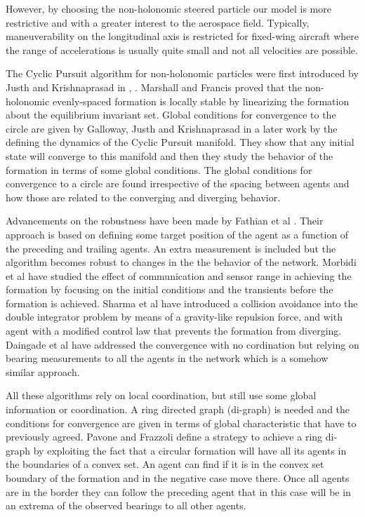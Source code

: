 However, by choosing the non-holonomic steered particle our model is more restrictive and with a greater interest to the aerospace field. Typically, maneuverability on the longitudinal axis is restricted for fixed-wing aircraft where the range of accelerations is usually quite small and not all velocities are possible. 

The Cyclic Pursuit algorithm for non-holonomic particles were first introduced by Justh and Krishnaprasad in \cite{justh2002simple}, \cite{justh2003steering}. Marshall and Francis \cite{marshall2004formations} proved that the non-holonomic evenly-spaced  formation is locally stable by linearizing the formation about the equilibrium invariant set. Global conditions for convergence to the circle are given by Galloway, Justh and Krishnaprasad in a later work\cite{galloway2013symmetry} by the defining the dynamics of the Cyclic Pursuit manifold. They show that any initial state will converge to this manifold and then they study the behavior of the formation in terms of some global conditions. The global conditions for convergence to a circle are found irrespective of the spacing between agents and how those are related to the converging and diverging behavior.

Advancements on the robustness have been made by Fathian et al \cite{fathian2016distributed}. Their approach is based on defining some target position of the agent as a function of the preceding and trailing agents. An extra measurement is included but the algorithm becomes robust to changes in the the behavior of the network. Morbidi et al \cite{morbidi2010maintaining} have studied the effect of communication and sensor range in achieving the formation by focusing on the initial conditions and the transients before the formation is achieved. Sharma et al \cite{sharma2012cylic} have introduced a collision avoidance into the double integrator problem by means of a gravity-like repulsion force, and with agent with a modified control law that prevents the formation from diverging. Daingade et al \cite{daingage2016failsafe} have addressed the convergence with no cordination but relying on bearing measurements to all the agents in the network which is a somehow similar approach.

All these algorithms rely on local coordination, but still use some global information or coordination. A ring directed graph (di-graph) is needed and the conditions for convergence are given in terms of global characteristic that have to previously agreed. Pavone and Frazzoli \cite{pavone2007decentralized} define a strategy to achieve a ring di-graph by exploiting the fact that a circular formation will have all its agents in the boundaries of a convex set. An agent can find if it is in the convex set boundary of the formation and in the negative case move there. Once all agents are in the border they can follow the preceding agent that in this case will be in an extrema of the observed bearings to all other agents.

